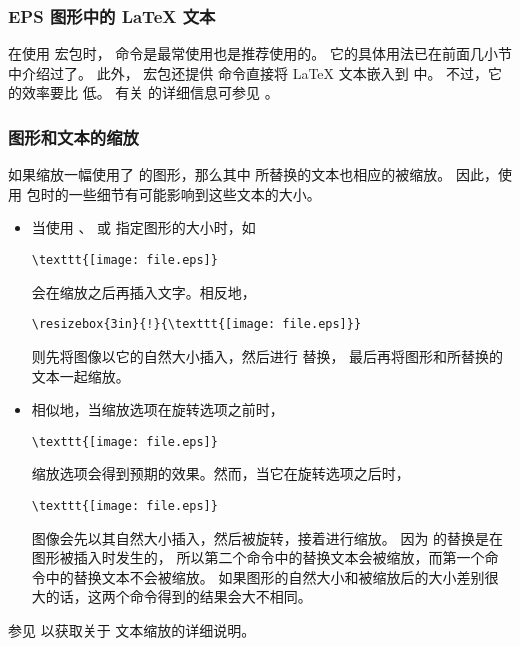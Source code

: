 \subsubsection{EPS 图形中的 \LaTeX{} 文本}\label{sssec:latextext}

在使用  宏包时， 命令是最常使用也是推荐使用的。
它的具体用法已在前面几小节中介绍过了。
此外， 宏包还提供  命令直接将 \LaTeX{} 文本嵌入到  中。
不过，它的效率要比  低。
有关  的详细信息可参见 \cite{psfrag-doc}。

\subsubsection{图形和文本的缩放}\label{sssec:psfragscale}

如果缩放一幅使用了  的图形，那么其中  所替换的文本也相应的被缩放。
因此，使用  包时的一些细节有可能影响到这些文本的大小。

\begin{itemize}
\item 当使用 、 或  指定图形的大小时，如
\begin{lstlisting}
\texttt{[image: file.eps]}
\end{lstlisting}
       会在缩放之后再插入文字。相反地，
\begin{lstlisting}
\resizebox{3in}{!}{\texttt{[image: file.eps]}}
\end{lstlisting}
      则先将图像以它的自然大小插入，然后进行 替换，
      最后再将图形和所替换的文本一起缩放。
      
\item 相似地，当缩放选项在旋转选项之前时，
\begin{lstlisting}
\texttt{[image: file.eps]}
\end{lstlisting}
      缩放选项会得到预期的效果。然而，当它在旋转选项之后时，
\begin{lstlisting}
\texttt{[image: file.eps]}
\end{lstlisting}
      图像会先以其自然大小插入，然后被旋转，接着进行缩放。
      因为  的替换是在图形被插入时发生的，
      所以第二个命令中的替换文本会被缩放，而第一个命令中的替换文本不会被缩放。
      如果图形的自然大小和被缩放后的大小差别很大的话，这两个命令得到的结果会大不相同。
\end{itemize}
参见 \cite{psfrag-doc} 以获取关于  文本缩放的详细说明。

